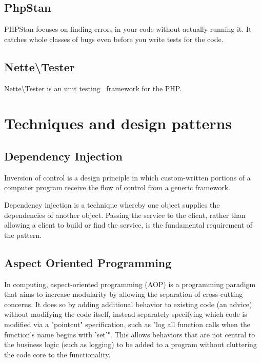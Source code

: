 \subsection{PhpStan} \label{sec:theory:phpstan}

PHPStan focuses on finding errors in your code without actually running it. It catches whole classes of bugs even before you write tests for the code.~\cite{github:phpstan}

\subsection{Nette\textbackslash{}Tester} \label{sec:theory:nette-tester}

Nette\textbackslash{}Tester is an unit testing~\cite{wiki:unit-testing} framework for the PHP.~\cite{tester:docs}

\section{Techniques and design patterns}

\subsection{Dependency Injection} \label{sec:theory:di}

Inversion of control is a design principle in which custom-written portions of a computer program receive the flow of control from a generic framework.

Dependency injection is a technique whereby one object supplies the dependencies of another object. Passing the service to the client, rather than allowing a client to build or find the service, is the fundamental requirement of the pattern.~\cite{fowler:di}

\subsection{Aspect Oriented Programming} \label{sec:theory:aop}

In computing, aspect-oriented programming (AOP) is a programming paradigm that aims to increase modularity by allowing the separation of cross-cutting concerns. It does so by adding additional behavior to existing code (an advice) without modifying the code itself, instead separately specifying which code is modified via a "pointcut" specification, such as "log all function calls when the function's name begins with 'set'". This allows behaviors that are not central to the business logic (such as logging) to be added to a program without cluttering the code core to the functionality.~\cite{wiki:aop}

